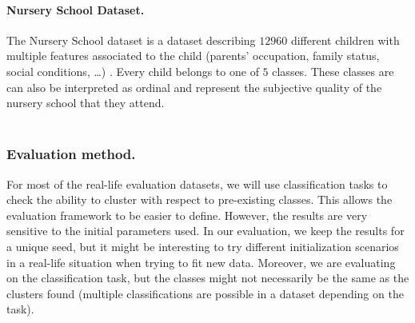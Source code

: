\paragraph{Nursery School Dataset.} The Nursery School dataset is a dataset describing $12960$ different children with multiple features associated to the child (parents' occupation, family status, social conditions, \ldots) \citep{misc_nursery_76}. Every child belongs to one of $5$ classes. 
These classes are can also be interpreted as ordinal and represent the subjective quality of the nursery school that they attend. \\ \\

\subsubsection{Evaluation method.} \label{sec:evaluation_method}
For most of the real-life evaluation datasets, we will use classification tasks to check the ability to cluster with respect to pre-existing classes. This allows the evaluation framework to be easier to define. However, the results are very sensitive to the initial parameters used. In our evaluation, we keep the results for a unique seed, but it might be interesting to try different initialization scenarios in a real-life situation when trying to fit new data. 
Moreover, we are evaluating on the classification task, but the classes might not necessarily be the same as the clusters found (multiple classifications are possible in a dataset depending on the task).

